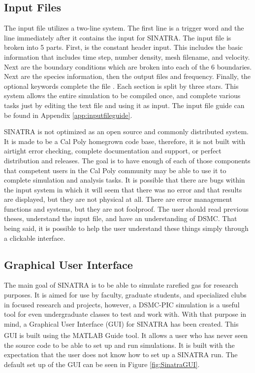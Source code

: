 \subsection{Input Files}
The input file utilizes a two-line system. The first line is a trigger word and the line immediately after it contains the input for SINATRA. The input file is broken into 5 parts. First, is the constant header input. This includes the basic information that includes time step, number density, mesh filename, and velocity. Next are the boundary conditions which are broken into each of the 6 boundaries. Next are the species information, then the output files and frequency. Finally, the optional keywords  complete the file . Each section is split by three stars. This system allows the entire simulation to be compiled once, and complete various tasks just by editing the text file and using it as input. The input file guide can be found in Appendix \ref{app:inputfileguide}. \par
\indent SINATRA is not optimized as an open source and commonly distributed system. It is made to be a Cal Poly homegrown code base, therefore, it is not built with airtight error checking, complete documentation and support, or perfect distribution and releases. The goal is to have enough of each of those components that competent users in the Cal Poly community may be able to use it to complete simulation and analysis tasks. It is possible that there are bugs within the input system in which it will seem that there was no error and that results are displayed, but they are not physical at all. There are error management functions and systems, but they are not foolproof. The user should read previous theses, understand the input file, and have an understanding of DSMC. That being said, it is possible to help the user understand these things simply through a clickable interface.

\subsection{Graphical User Interface}
The main goal of SINATRA is to be able to simulate rarefied gas for research purposes. It is aimed for use by faculty, graduate students, and specialized clubs in focused research and projects, however, a DSMC-PIC simulation is a useful tool for even undergraduate classes to test and work with. With that purpose in mind, a Graphical User Interface (GUI) for SINATRA has been created. This GUI is built using the MATLAB\textsuperscript{\textregistered} Guide tool. It allows a user who has never seen the source code to be able to set up and run simulations. It is built with the expectation that the user does not know how to set up a SINATRA run. The default set up of the GUI can be seen in Figure \ref{fig:SinatraGUI}. \par

